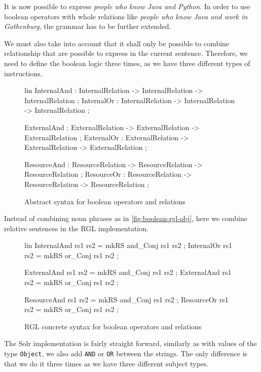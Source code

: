 It is now possible to express \emph{people who know Java and Python}. In order to use boolean operators with whole relations like \emph{people who know Java and work in Gothenburg}, the grammar has to be further extended.

We must also take into account that it shall only be possible to combine relationship that are possible to express in the current sentence. Therefore, we need to define the boolean logic three times, as we have three different types of instructions.

\begin{figure}[H]
\begin{code}
lin
  InternalAnd : InternalRelation -> InternalRelation -> InternalRelation ;
  InternalOr : InternalRelation -> InternalRelation -> InternalRelation ;

  ExternalAnd : ExternalRelation -> ExternalRelation -> ExternalRelation ;
  ExternalOr : ExternalRelation -> ExternalRelation -> ExternalRelation ;
 	  
  ResourceAnd : ResourceRelation -> ResourceRelation -> ResourceRelation ;
  ResourceOr : ResourceRelation -> ResourceRelation -> ResourceRelation ;
\end{code}
\caption{Abstract syntax for boolean operators and relations\label{fig:boolean-abstract-relations}}
\end{figure}

Instead of combining noun phrases as in \autoref{fig:boolean-rgl-obj}, here we combine relative sentences in the RGL implementation.

\begin{figure}[H]
\begin{code}
lin
  InternalAnd rs1 rs2 = mkRS and_Conj rs1 rs2 ;
  InternalOr rs1 rs2 = mkRS or_Conj rs1 rs2 ;
	  
  ExternalAnd rs1 rs2 = mkRS and_Conj rs1 rs2 ;
  ExternalAnd rs1 rs2 = mkRS or_Conj rs1 rs2 ;
	  
  ResourceAnd rs1 rs2 = mkRS and_Conj rs1 rs2 ;
  ResourceOr rs1 rs2 = mkRS or_Conj rs1 rs2 ;
\end{code}
\caption{RGL concrete syntax for boolean operators and relations\label{fig:boolean-rgl-relations}}
\end{figure}

The Solr implementation is fairly straight forward, similarly as with values of the type \texttt{Object}, we also add \texttt{AND} or \texttt{OR} between the strings. The only difference is that we do it three times as we have three different subject types.

